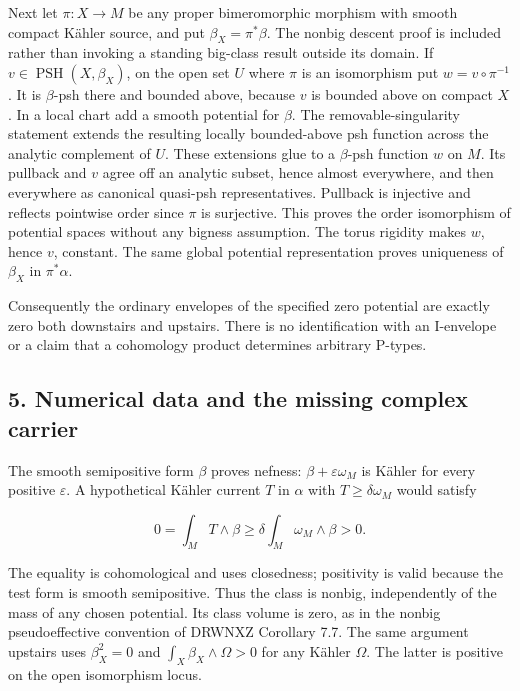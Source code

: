 \documentclass[11pt]{article}
\begin{document}
Next let $\pi:X\to M$ be any proper bimeromorphic morphism with smooth compact Kähler source, and put $\beta_X=\pi^*\beta$. The nonbig descent proof is included rather than invoking a standing big-\allowbreak{}class result outside its domain. If $v\in\operatorname{PSH}(X,\beta_X)$, on the open set $U$ where $\pi$ is an isomorphism put $w=v\circ\pi^{-1}$. It is $\beta$-\allowbreak{}psh there and bounded above, because $v$ is bounded above on compact $X$. In a local chart add a smooth potential for $\beta$. The removable-\allowbreak{}singularity statement extends the resulting locally bounded-\allowbreak{}above psh function across the analytic complement of $U$. These extensions glue to a $\beta$-\allowbreak{}psh function $w$ on $M$. Its pullback and $v$ agree off an analytic subset, hence almost everywhere, and then everywhere as canonical quasi-\allowbreak{}psh representatives. Pullback is injective and reflects pointwise order since $\pi$ is surjective. This proves the order isomorphism of potential spaces without any bigness assumption. The torus rigidity makes $w$, hence $v$, constant. The same global potential representation proves uniqueness of $\beta_X$ in $\pi^*\alpha$.

Consequently the ordinary envelopes of the specified zero potential are exactly zero both downstairs and upstairs. There is no identification with an I-\allowbreak{}envelope or a claim that a cohomology product determines arbitrary P-\allowbreak{}types.

\subsection{5. Numerical data and the missing complex carrier}

The smooth semipositive form $\beta$ proves nefness: $\beta+\varepsilon\omega_M$ is Kähler for every positive $\varepsilon$. A hypothetical Kähler current $T$ in $\alpha$ with $T\geq\delta\omega_M$ would satisfy

\[0=\int_M T\wedge\beta\geq\delta\int_M\omega_M\wedge\beta>0.\]

The equality is cohomological and uses closedness; positivity is valid because the test form is smooth semipositive. Thus the class is nonbig, independently of the mass of any chosen potential. Its class volume is zero, as in the nonbig pseudoeffective convention of DRWNXZ Corollary 7.7. The same argument upstairs uses $\beta_X^2=0$ and $\int_X\beta_X\wedge\Omega>0$ for any Kähler $\Omega$. The latter is positive on the open isomorphism locus.
\end{document}
